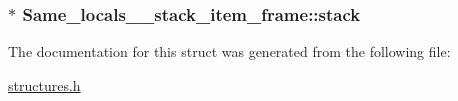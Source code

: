 \subsubsection[{\texorpdfstring{stack}{stack}}]{$\ast$ Same\+\_\+locals\+\_\+\_\+stack\+\_\+item\+\_\+frame\+::stack}\hypertarget{structSame__locals__1__stack__item__frame_aea334c9e9f4e42aad07a6ec10a7f058a}{}\label{structSame__locals__1__stack__item__frame_aea334c9e9f4e42aad07a6ec10a7f058a}


The documentation for this struct was generated from the following file\+:\begin{DoxyCompactItemize}
\item 
\hyperlink{structures_8h}{structures.\+h}\end{DoxyCompactItemize}
